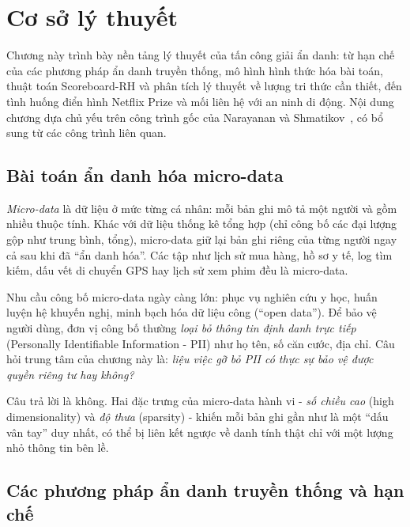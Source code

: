 \chapter{Cơ sở lý thuyết}
\label{chap:background}

Chương này trình bày nền tảng lý thuyết của tấn công giải ẩn danh: từ hạn chế của các phương pháp ẩn danh truyền thống, mô hình hình thức hóa bài toán, thuật toán Scoreboard-RH và phân tích lý thuyết về lượng tri thức cần thiết, đến tình huống điển hình Netflix Prize và mối liên hệ với an ninh di động. Nội dung chương dựa chủ yếu trên công trình gốc của Narayanan và Shmatikov~\cite{narayanan}, có bổ sung từ các công trình liên quan.

\section{Bài toán ẩn danh hóa micro-data}

\textit{Micro-data} là dữ liệu ở mức từng cá nhân: mỗi bản ghi mô tả một người và gồm nhiều thuộc tính. Khác với dữ liệu thống kê tổng hợp (chỉ công bố các đại lượng gộp như trung bình, tổng), micro-data giữ lại bản ghi riêng của từng người ngay cả sau khi đã ``ẩn danh hóa''. Các tập như lịch sử mua hàng, hồ sơ y tế, log tìm kiếm, dấu vết di chuyển GPS hay lịch sử xem phim đều là micro-data.

Nhu cầu công bố micro-data ngày càng lớn: phục vụ nghiên cứu y học, huấn luyện hệ khuyến nghị, minh bạch hóa dữ liệu công (``open data''). Để bảo vệ người dùng, đơn vị công bố thường \textit{loại bỏ thông tin định danh trực tiếp} (Personally Identifiable Information - PII) như họ tên, số căn cước, địa chỉ. Câu hỏi trung tâm của chương này là: \textit{liệu việc gỡ bỏ PII có thực sự bảo vệ được quyền riêng tư hay không?}

Câu trả lời là không. Hai đặc trưng của micro-data hành vi - \textit{số chiều cao} (high dimensionality) và \textit{độ thưa} (sparsity) - khiến mỗi bản ghi gần như là một ``dấu vân tay'' duy nhất, có thể bị liên kết ngược về danh tính thật chỉ với một lượng nhỏ thông tin bên lề.

\section{Các phương pháp ẩn danh truyền thống và hạn chế}

